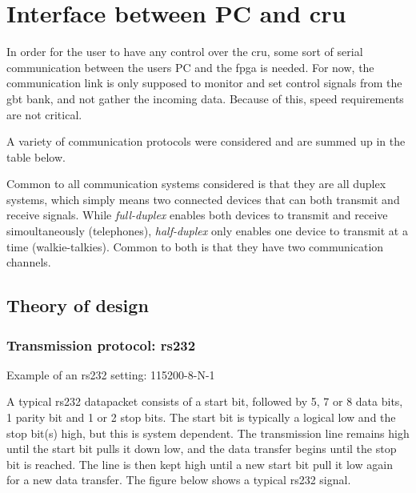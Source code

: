 \documentclass[main.tex]{subfiles}
\begin{document}
\chapter{Interface between PC and \acrshort{cru}}

In order for the user to have any control over the \gls{cru}, some sort of serial communication between the users PC and the \gls{fpga} is needed. For now, the communication link is only supposed to monitor and set control signals from the \gls{gbt} bank, and not gather the incoming data. Because of this, speed requirements are not critical. 

A variety of communication protocols were considered and are summed up in the table below. 

Common to all communication systems considered is that they are all duplex systems, which simply means two connected devices that can both transmit and receive signals. While \textit{full-duplex} enables both devices to transmit and receive simoultaneously (telephones), \textit{half-duplex} only enables one device to transmit at a time (walkie-talkies). Common to both is that they have two communication channels. 




\section{Theory of design}


\subsection{Transmission protocol: \gls{rs232}}

Example of an \gls{rs232} setting: 115200-8-N-1

A typical \gls{rs232} datapacket consists of a start bit, followed by 5, 7 or 8 data bits, 1 parity bit and 1 or 2 stop bits. The start bit is typically a logical low and the stop bit(s) high, but this is system dependent. The transmission line remains high until the start bit pulls it down low, and the data transfer begins until the stop bit is reached. The line is then kept high until a new start bit pull it low again for a new data transfer. The figure below shows a typical \gls{rs232} signal.
\end{document}
